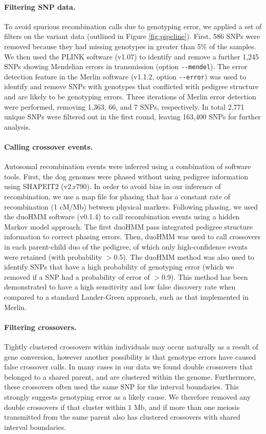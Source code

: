 \paragraph{Filtering SNP data.}
To avoid spurious recombination calls due to genotyping error, we applied a set of filters on the variant data (outlined in Figure \ref{fig:pipeline}).
First, 586 SNPs were removed because they had missing genotypes in greater than 5\% of the samples.
We then used the PLINK\cite{Purcell2007} software (v1.07) to identify and remove a further 1,245 SNPs showing Mendelian errors in transmission (option \verb|--mendel|).
The error detection feature in the Merlin\cite{Abecasis2002} software (v1.1.2, option \verb|--error|) was used to identify and remove SNPs with genotypes that conflicted with pedigree structure and are likely to be genotyping errors.
Three iterations of Merlin error detection were performed, removing 1,363, 66, and 7 SNPs, respectively.
In total 2,771 unique SNPs were filtered out in the first round, leaving 163,400 SNPs for further analysis.

\paragraph{Calling crossover events.}
Autosomal recombination events were inferred using a combination of software tools.
First, the dog genomes were phased without using pedigree information using SHAPEIT2\cite{Delaneau2013} (v2.r790).
In order to avoid bias in our inference of recombination, we use a map file for phasing that has a constant rate of recombination (1 cM/Mb) between physical markers.
Following phasing, we used the duoHMM\cite{OConnell2014} software (v0.1.4) to call recombination events using a hidden Markov model approach.
The first duoHMM pass integrated pedigree structure information to correct phasing errors.
Then, duoHMM was used to call crossovers in each parent-child duo of the pedigree, of which only high-confidence events were retained (with probability $>$0.5).
The duoHMM method was also used to identify SNPs that have a high probability of genotyping error (which we removed if a SNP had a probability of error of $>$0.9).
This method has been demonstrated to have a high sensitivity and low false discovery rate when compared to a standard Lander-Green\cite{Lander1987} approach, such as that implemented in Merlin\cite{Abecasis2002}.

\paragraph{Filtering crossovers.}
Tightly clustered crossovers within individuals may occur naturally as a result of gene conversion, however another possibility is that genotype errors have caused false crossover calls.
In many cases in our data we found double crossovers that belonged to a shared parent, and are clustered within the genome.
Furthermore, these crossovers often used the same SNP for the interval boundaries.
This strongly suggests genotyping error as a likely cause.
We therefore removed any double crossovers if that cluster within 1 Mb, and if more than one meiosis transmitted from the same parent also has clustered crossovers with shared interval boundaries.

